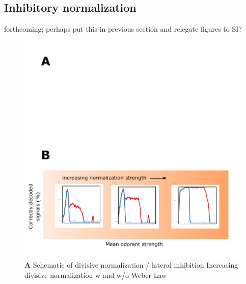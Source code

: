 


\subsection{Inhibitory normalization}



{\color{blue} forthcoming; perhaps put this in previous section and relegate figures to SI?}





\begin{figure}
	\includegraphics[width=\textwidth]{figures/Figures_signal_decoding_weber_law_2}
	\caption{\textbf{A} Schematic of divisive normalization / lateral inhibition  Increasing divisive normalization w and w/o Weber Law}
	\label{fig:divisive_normalization}
\end{figure}



